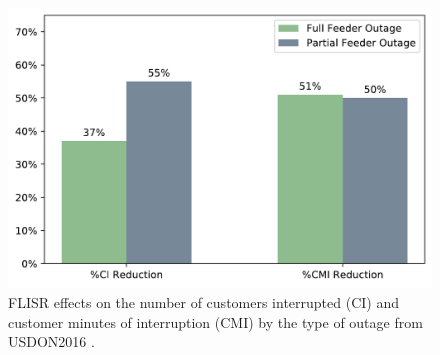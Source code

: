 \begin{figure}
    \centering
	\includegraphics[scale = 0.5]{_introduction/fig/type_outage}
	\caption{FLISR effects on the number of customers interrupted (CI) and customer minutes of interruption (CMI) by the type of outage from USDON2016 \cite{USDepartmentofEnergy2016}.}
	\label{ch-introduction:fig:type_outage}
\end{figure}
